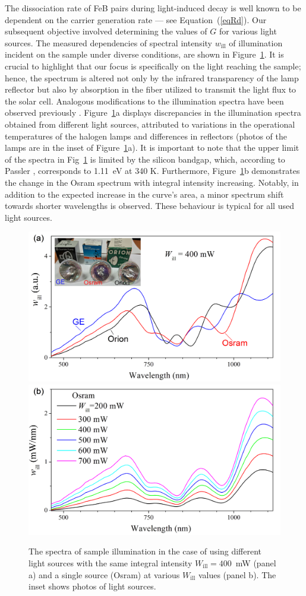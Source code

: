 \documentclass{WileyMSP-template}
\begin{document}
The dissociation rate of FeB pairs during light-induced decay is well known 
to be dependent on the carrier generation rate --- see Equation~(\ref{eqRd}). 
Our subsequent objective involved determining the values of $G$ for various light sources. 
The measured dependencies of spectral intensity $w_\mathrm{ill}$ of illumination incident on the sample under diverse conditions, 
are shown in Figure~\ref{fig4}.
It is crucial to highlight that our focus is specifically on the light reaching the sample; 
hence, the spectrum is altered not only by the infrared transparency of the lamp reflector but also by absorption in the fiber 
utilized to transmit the light flux to the solar cell. 
Analogous modifications to the illumination spectra have been observed previously \cite{Libra2017}.
Figure~\ref{fig4}a displays discrepancies in the illumination spectra obtained from different light sources, 
attributed to variations in the operational temperatures of the halogen lamps and differences in reflectors 
(photos of the lamps are in the inset of Figure~\ref{fig4}a). 
It is important to note that the upper limit of the spectra in Fig~\ref{fig4} 
is limited by the silicon bandgap, which, according to Passler \cite{Pasler}, corresponds to 1.11~eV at 340 K.
Furthermore, Figure~\ref{fig4}b demonstrates the change in the Osram spectrum with integral intensity increasing. 
Notably, in addition to the expected increase in the curve's area, a minor spectrum shift towards shorter wavelengths is observed.
These behaviour is typical for all used light sources.



\begin{figure}
\centering
  \includegraphics[width=0.4\linewidth]{Fig4a.png}
  \includegraphics[width=0.4\linewidth]{Fig4b.png}
  \caption{
  The spectra of sample illumination in the case of using different light sources
  with the same integral intensity $W_\mathrm{ill}=400$~mW (panel a) and a single source (Osram)
 at various $W_\mathrm{ill}$ values (panel b).
 The inset shows photos of light sources.
}
  \label{fig4}
\end{figure}
\end{document}
